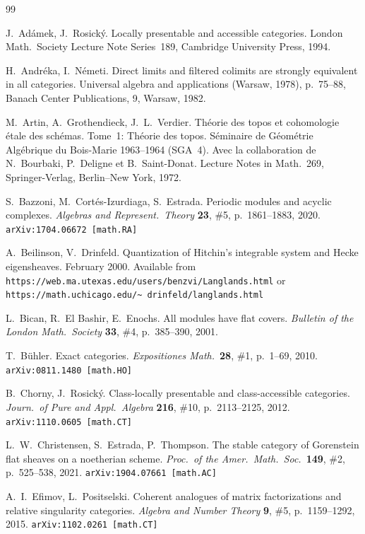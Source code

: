\documentclass[12pt,a4paper]{amsart}
\newcommand{\+}{\protect\nobreakdash-}
\renewcommand{\:}{\colon}
\theoremstyle{plain}
\theoremstyle{definition}
\begin{document}
\bigskip
\begin{thebibliography}{99}
\smallskip

 J.~Ad\'amek, J.~Rosick\'y.
   Locally presentable and accessible categories.
London Math.\ Society Lecture Note Series~189,
Cambridge University Press, 1994.

 H.~Andr\'eka, I.~N\'emeti.
   Direct limits and filtered colimits are strongly equivalent in all
categories.
 Universal algebra and applications (Warsaw, 1978), p.~75--88,
Banach Center Publications, 9, Warsaw, 1982.

 M.~Artin, A.~Grothendieck, J.~L.~Verdier.
   Th\'{e}orie des topos et cohomologie \'{e}tale des sch\'{e}mas.
	 Tome~1: Th\'eorie des topos.
S\'{e}minaire de G\'{e}om\'{e}trie Alg\'{e}brique du Bois-Marie
1963--1964 (SGA~4).
Avec la collaboration de N.~Bourbaki, P.~Deligne et B.~Saint-Donat.
Lecture Notes in Math.~269, Springer-Verlag, Berlin--New York, 1972.

 S.~Bazzoni, M.~Cort\'es-Izurdiaga, S.~Estrada.
   Periodic modules and acyclic complexes.
\textit{Algebras and Represent.\ Theory} \textbf{23}, \#5,
p.~1861--1883, 2020.  \texttt{arXiv:1704.06672 [math.RA]}

 A.~Beilinson, V.~Drinfeld.
   Quantization of Hitchin's integrable system and Hecke
eigensheaves.  February 2000.  Available from
\texttt{https://web.ma.utexas.edu/users/benzvi/Langlands.html} or
\texttt{https://math.uchicago.edu/\textasciitilde
drinfeld/langlands.html}

 L.~Bican, R.~El Bashir, E.~Enochs.
   All modules have flat covers.
\textit{Bulletin of the London Math.\ Society} \textbf{33}, \#4,
p.~385--390, 2001.

 T.~B\"uhler.
   Exact categories.
\textit{Expositiones Math.}\ \textbf{28}, \#1, p.~1--69, 2010.
\texttt{arXiv:0811.1480 [math.HO]}

 B.~Chorny, J.~Rosick\'y.
   Class-locally presentable and class-accessible categories.
\textit{Journ.\ of Pure and Appl.\ Algebra} \textbf{216}, \#10,
p.~2113--2125, 2012.  \texttt{arXiv:1110.0605 [math.CT]}

 L.~W.~Christensen, S.~Estrada, P.~Thompson.
   The stable category of Gorenstein flat sheaves on a noetherian
scheme.
\textit{Proc.\ of the Amer.\ Math.\ Soc.}\ \textbf{149}, \#2,
p.~525--538, 2021.  \texttt{arXiv:1904.07661 [math.AC]}

 A.~I.~Efimov, L.~Positselski.
   Coherent analogues of matrix factorizations and relative
singularity categories.
\textit{Algebra and Number Theory} \textbf{9}, \#5, p.~1159--1292,
2015.  \texttt{arXiv:1102.0261 [math.CT]}


\end{thebibliography}
\end{document}

